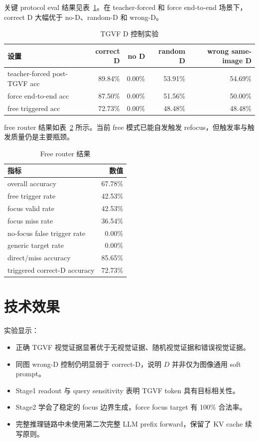 \documentclass[10pt,twocolumn]{ctexart}
\begin{document}
关键 protocol eval 结果见表~\ref{tab:controls}。在 teacher-forced 和 force end-to-end 场景下，correct D 大幅优于 no-D、random-D 和 wrong-D。

\begin{table}[t]
\centering
\small
\caption{TGVF D 控制实验}
\label{tab:controls}
\begin{tabular}{lrrrr}
\toprule
设置 & correct D & no D & random D & wrong same-image D \\
\midrule
teacher-forced post-TGVF acc & 89.84\% & 0.00\% & 53.91\% & 54.69\% \\
force end-to-end acc & 87.50\% & 0.00\% & 51.56\% & 50.00\% \\
free triggered acc & 72.73\% & 0.00\% & 48.48\% & 48.48\% \\
\bottomrule
\end{tabular}
\end{table}

free router 结果如表~\ref{tab:free} 所示。当前 free 模式已能自发触发 refocus，但触发率与触发质量仍是主要瓶颈。

\begin{table}[h]
\centering
\small
\caption{Free router 结果}
\label{tab:free}
\begin{tabular}{lr}
\toprule
指标 & 数值 \\
\midrule
overall accuracy & 67.78\% \\
free trigger rate & 42.53\% \\
focus valid rate & 42.53\% \\
focus miss rate & 36.54\% \\
no-focus false trigger rate & 0.00\% \\
generic target rate & 0.00\% \\
direct/miss accuracy & 85.65\% \\
triggered correct-D accuracy & 72.73\% \\
\bottomrule
\end{tabular}
\end{table}

\section{技术效果}

实验显示：

\begin{itemize}
  \item 正确 TGVF 视觉证据显著优于无视觉证据、随机视觉证据和错误视觉证据。
  \item 同图 wrong-D 控制仍明显弱于 correct-D，说明 $D$ 并非仅为图像通用 soft prompt。
  \item Stage1 readout 与 query sensitivity 表明 TGVF token 具有目标相关性。
  \item Stage2 学会了稳定的 focus 边界生成，force focus target 有 100\% 合法率。
  \item 完整推理链路中未使用第二次完整 LLM prefix forward，保留了 KV cache 续写原则。
\end{itemize}
\end{document}

